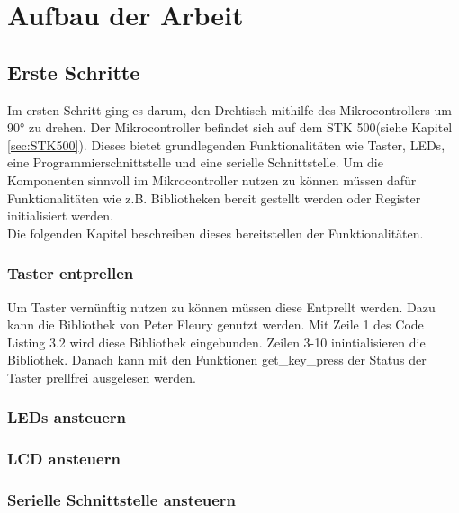 \chapter{Aufbau der Arbeit}
\label{sec:AufbauDerArbeit}

\section{Erste Schritte}
Im ersten Schritt ging es darum, den Drehtisch mithilfe des Mikrocontrollers um 90° zu drehen. Der Mikrocontroller befindet sich auf dem STK 500(siehe Kapitel \ref{sec:STK500}). Dieses bietet grundlegenden Funktionalitäten wie Taster, LEDs, eine Programmierschnittstelle und eine serielle Schnittstelle.
Um die Komponenten sinnvoll im Mikrocontroller nutzen zu können müssen dafür Funktionalitäten wie z.B. Bibliotheken bereit gestellt werden oder Register initialisiert werden.\\
Die folgenden Kapitel beschreiben dieses bereitstellen der Funktionalitäten.
\subsection{Taster entprellen}
\label{sec:Taster}
Um Taster vernünftig nutzen zu können müssen diese Entprellt werden. Dazu kann die Bibliothek von Peter Fleury genutzt werden. Mit Zeile 1 des Code Listing 3.2 wird diese Bibliothek eingebunden. Zeilen 3-10 inintialisieren die Bibliothek.
Danach kann mit den Funktionen get\_key\_press der Status der Taster prellfrei ausgelesen werden.
\lstset{language=C, basicstyle=\footnotesize, showstringspaces=false, tabsize=2}


\subsection{LEDs ansteuern}
\subsection{LCD ansteuern}
\subsection{Serielle Schnittstelle ansteuern}	